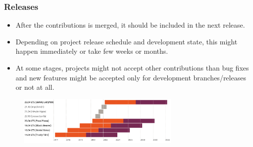 \documentclass[aspectratio=169]{beamer}              %
\begin{document}
\begin{frame}
	\frametitle{Releases}
	
\begin{block}{}
		\begin{itemize}
			\item After the contributions is merged, it should be included in the next release.
			\item Depending on project release schedule and development state, this might happen immediately or take few weeks or months.
			\item At some stages, projects might not accept other contributions than bug fixes and new features might be accepted only for development branches/releases or not at all.
		\end{itemize}
\end{block}
\begin{figure}[ht!]
	\begin{center}
  	  \includegraphics[width=0.7\textwidth]{img/ubuntu-releases.png}
	\end{center}
\end{figure}

\end{frame}
\end{document}
